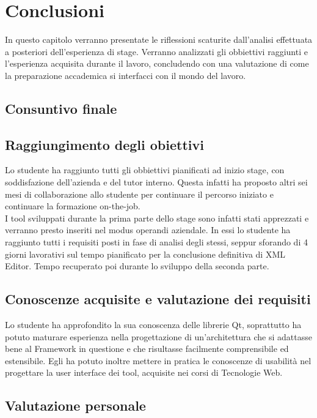 
\chapter{Conclusioni}
\label{cap:conclusioni}

In questo capitolo verranno presentate le riflessioni scaturite dall'analisi effettuata a posteriori dell'esperienza di stage. Verranno analizzati gli obbiettivi raggiunti e l'esperienza acquisita durante il lavoro, concludendo con una valutazione di come la preparazione accademica si interfacci con il mondo del lavoro.

\section{Consuntivo finale}

\section{Raggiungimento degli obiettivi}

Lo studente ha raggiunto tutti gli obbiettivi pianificati ad inizio stage, con soddisfazione dell'azienda e del tutor interno. Questa infatti ha proposto altri sei mesi di collaborazione allo studente per continuare il percorso iniziato e continuare la formazione on-the-job.\\

I tool sviluppati durante la prima parte dello stage sono infatti stati apprezzati e verranno presto inseriti nel modus operandi aziendale. In essi lo studente ha raggiunto tutti i requisiti posti in fase di analisi degli stessi, seppur sforando di 4 giorni lavorativi sul tempo pianificato per la conclusione definitiva di XML Editor. Tempo recuperato poi durante lo sviluppo della seconda parte.\\

\section{Conoscenze acquisite e valutazione dei requisiti }

Lo studente ha approfondito la sua conoscenza delle librerie Qt, soprattutto ha potuto maturare esperienza nella progettazione di un'architettura che si adattasse bene al Framework in questione e che risultasse facilmente comprensibile ed estensibile. Egli ha potuto inoltre mettere in pratica le conoscenze di usabilità nel progettare la user interface dei tool, acquisite nei corsi di Tecnologie Web.



\section{Valutazione personale}
